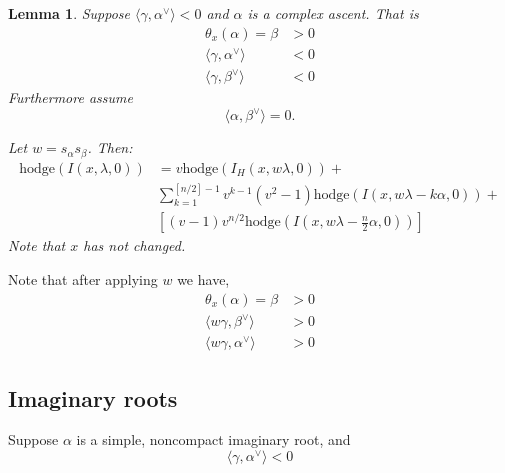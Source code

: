 \documentclass[12pt,leqno]{article}
\newtheorem{lemma}[equation]{Lemma}
\newcommand{\hodge}{\text{hodge}}
\newcommand{\ch}[1]{#1^\vee}
\newcommand{\subsec}[1]{\subsection{#1}
\renewcommand{\theequation}{\thesubsection.\arabic{equation}}}
\begin{document}
\begin{lemma}
\label{l:complexdouble}
Suppose $\langle\gamma,\ch\alpha\rangle<0$ and $\alpha$ is a complex ascent.
That is
$$
\begin{aligned}
\theta_x(\alpha)=\beta&>0\\
\langle\gamma,\ch\alpha\rangle&<0\\
\langle\gamma,\ch\beta\rangle&<0
\end{aligned}
$$
 Furthermore assume
$$
\langle \alpha,\ch\beta\rangle=0.
$$

Let $w=s_\alpha s_\beta$. Then:
{\normalfont
\begin{equation}
\begin{aligned}
\hodge(I(x,\lambda,0))&=v\hodge(I_H(x,w\lambda,0)) +\\& \sum_{k=1}^{[n/2]-1}v^{k-1}(v^2-1)\hodge(I(x,w\lambda-k\alpha,0))+ \\
& [(v-1)v^{n/2}\hodge(I(x,w\lambda-\frac n2\alpha,0))]
\end{aligned}
\end{equation}
}
Note that $x$ has not changed.
\end{lemma}

Note that after applying $w$ we have,
$$
\begin{aligned}
\theta_{x}(\alpha)=\beta&>0\\
\langle w\gamma,\ch\beta\rangle &>0\\
\langle w\gamma,\ch\alpha\rangle &>0
\end{aligned}
$$

\subsec{Imaginary roots}

Suppose $\alpha$ is a simple, noncompact imaginary root, and
$$
\langle \gamma,\ch\alpha\rangle<0
$$
\end{document}

